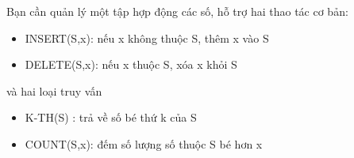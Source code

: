 Bạn cần quản lý một tập hợp động các số, hỗ trợ hai thao tác cơ bản:  
\begin{itemize}
	\item     INSERT(S,x): nếu x không thuộc S, thêm x vào S   
	\item     DELETE(S,x): nếu x thuộc S, xóa x khỏi S   
\end{itemize}

   và hai loại truy vấn  
\begin{itemize}
	\item     K-TH(S) : trả về số bé thứ k của S   
	\item     COUNT(S,x): đếm số lượng số thuộc S bé hơn x   
\end{itemize}